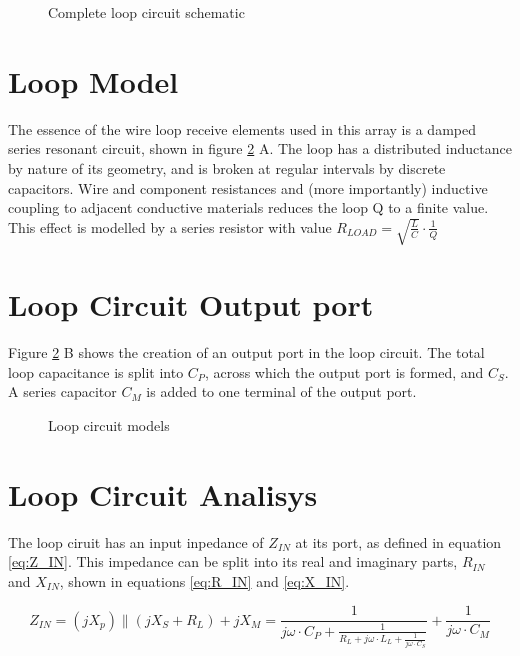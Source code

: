 \begin{figure}
    \centering
    
    \caption{Complete loop circuit schematic}
    \label{fig:loop_schematic}
\end{figure}

\section{Loop Model}
The essence of the wire loop receive elements used in this array is a damped series resonant circuit, shown in figure
\ref{fig:loop_model} A. The loop has a distributed inductance by nature of its geometry, and is broken at regular
intervals by discrete capacitors.  Wire and component resistances and (more importantly) inductive coupling to adjacent
conductive materials reduces the loop Q to a finite value. This effect is modelled by a series resistor with value
$R_{LOAD}=\sqrt{\frac{L}{C}}\cdot\frac{1}{Q}$

\section{Loop Circuit Output port}
Figure \ref{fig:loop_model} B shows the creation of an output port in the loop circuit. The total loop capacitance is
split into $C_P$, across which the output port is formed, and $C_S$. A series capacitor $C_M$ is added to one terminal
of the output port.


\begin{figure}
    \centering
    
    \caption{Loop circuit models}
    \label{fig:loop_model}
\end{figure}

\section{Loop Circuit Analisys}
The loop ciruit has an input inpedance of $Z_{IN}$ at its port, as defined in equation \ref{eq:Z_IN}. This impedance can
be split into its real and imaginary parts, $R_{IN}$ and $X_{IN}$, shown in equations \ref{eq:R_IN} and \ref{eq:X_IN}.

\begin{equation} \label{eq:Z_IN}
    Z_{IN}=(jX_p)\parallel(jX_S+R_{L})+jX_M = \frac{1}{j\omega \cdot C_P + \frac{1}{R_{L}+j\omega\cdot L_{L} +
    \frac{1}{j\omega \cdot C_S}}} + \frac{1}{j\omega\cdot C_M}
\end{equation}

